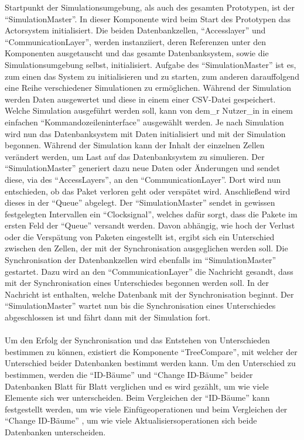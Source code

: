 \documentclass[a4paper,11pt,oneside,%
headsepline,												%
footsepline,												%
bibtotocnumbered									%
]{scrreprt}
\begin{document}
Startpunkt der Simulationsumgebung, als auch des gesamten Prototypen, ist der \enquote{SimulationMaster}. In dieser Komponente wird beim Start des Prototypen das Actorsystem initialisiert. Die beiden Datenbankzellen, \enquote{Accesslayer} und \enquote{CommunicationLayer}, werden instanziiert, deren Referenzen unter den Komponenten ausgetauscht und das gesamte Datenbanksystem, sowie die Simulationsumgebung selbst, initialisiert. Aufgabe des \enquote{SimulationMaster} ist es, zum einen das System zu initialisieren und zu starten, zum anderen darauffolgend eine Reihe verschiedener Simulationen zu ermöglichen. Während der Simulation werden Daten ausgewertet und diese in einem einer CSV-Datei gespeichert. Welche Simulation ausgeführt werden soll, kann von dem\_r Nutzer\_in  in einem einfachen \enquote{Kommandozeileninterface} ausgewählt werden. Je nach Simulation wird nun das Datenbanksystem mit Daten initialisiert und mit der Simulation begonnen. Während der Simulation kann der Inhalt der einzelnen Zellen verändert werden, um Last auf das Datenbanksystem zu simulieren. Der \enquote{SimulationMaster} generiert dazu neue Daten oder Änderungen und sendet diese, via des \enquote{AccessLayers}, an den \enquote{CommunicationLayer}. Dort wird nun entschieden, ob das Paket verloren geht oder verspätet wird. Anschließend wird dieses in der \enquote{Queue} abgelegt. Der \enquote{SimulationMaster} sendet in gewissen festgelegten Intervallen ein \enquote{Clocksignal}, welches dafür sorgt, dass die Pakete im ersten Feld der \enquote{Queue} versandt werden. Davon abhängig, wie hoch der Verlust oder die Verspätung von Paketen eingestellt ist, ergibt sich ein Unterschied zwischen den Zellen, der mit der Synchronisation ausgeglichen werden soll. Die Synchronisation der Datenbankzellen wird ebenfalls im \enquote{SimulationMaster} gestartet. Dazu wird an den \enquote{CommunicationLayer} die Nachricht gesandt, dass mit der Synchronisation eines Unterschiedes begonnen werden soll. In der Nachricht ist enthalten, welche Datenbank mit der Synchronisation beginnt. Der \enquote{SimulationMaster} wartet nun bis die Synchronisation eines Unterschiedes abgeschlossen ist und fährt dann mit der Simulation fort.\\\\

Um den Erfolg der Synchronisation und das Entstehen von Unterschieden bestimmen zu können, existiert die Komponente \enquote{TreeCompare}, mit welcher der Unterschied beider Datenbanken bestimmt werden kann. Um den Unterschied zu bestimmen, werden die \enquote{ID-Bäume} und \enquote{Change ID-Bäume} beider Datenbanken Blatt für Blatt verglichen und es wird gezählt, um wie viele Elemente sich wer unterscheiden. Beim Vergleichen der \enquote{ID-Bäume} kann festgestellt werden, um wie viele Einfügeoperationen und beim Vergleichen der \enquote{Change ID-Bäume} , um wie viele Aktualisiersoperationen sich beide Datenbanken unterscheiden.
\end{document}
